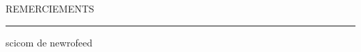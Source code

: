 \begin{center}
\MakeUppercase{\LARGE{R}\Large{emerciements}} \\
\noindent\rule{17cm}{0.4pt}
\end{center}

scicom de newrofeed